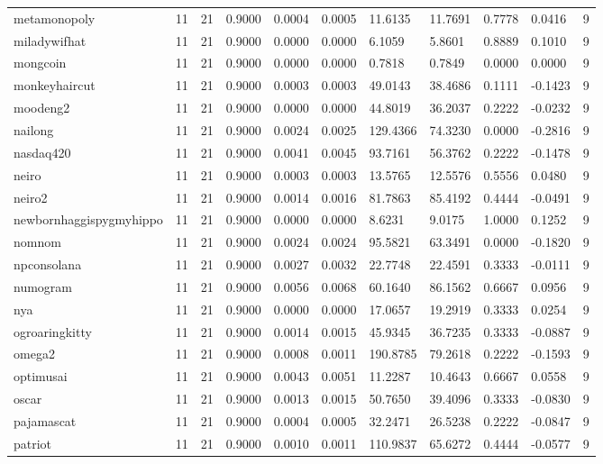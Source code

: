 \begin{table}[htbp]
\begin{tabular}{lllllllllll}
metamonopoly & 11 & 21 & 0.9000 & 0.0004 & 0.0005 & 11.6135 & 11.7691 & 0.7778 & 0.0416 & 9 \\
miladywifhat & 11 & 21 & 0.9000 & 0.0000 & 0.0000 & 6.1059 & 5.8601 & 0.8889 & 0.1010 & 9 \\
mongcoin & 11 & 21 & 0.9000 & 0.0000 & 0.0000 & 0.7818 & 0.7849 & 0.0000 & 0.0000 & 9 \\
monkeyhaircut & 11 & 21 & 0.9000 & 0.0003 & 0.0003 & 49.0143 & 38.4686 & 0.1111 & -0.1423 & 9 \\
moodeng2 & 11 & 21 & 0.9000 & 0.0000 & 0.0000 & 44.8019 & 36.2037 & 0.2222 & -0.0232 & 9 \\
nailong & 11 & 21 & 0.9000 & 0.0024 & 0.0025 & 129.4366 & 74.3230 & 0.0000 & -0.2816 & 9 \\
nasdaq420 & 11 & 21 & 0.9000 & 0.0041 & 0.0045 & 93.7161 & 56.3762 & 0.2222 & -0.1478 & 9 \\
neiro & 11 & 21 & 0.9000 & 0.0003 & 0.0003 & 13.5765 & 12.5576 & 0.5556 & 0.0480 & 9 \\
neiro2 & 11 & 21 & 0.9000 & 0.0014 & 0.0016 & 81.7863 & 85.4192 & 0.4444 & -0.0491 & 9 \\
newbornhaggispygmyhippo & 11 & 21 & 0.9000 & 0.0000 & 0.0000 & 8.6231 & 9.0175 & 1.0000 & 0.1252 & 9 \\
nomnom & 11 & 21 & 0.9000 & 0.0024 & 0.0024 & 95.5821 & 63.3491 & 0.0000 & -0.1820 & 9 \\
npconsolana & 11 & 21 & 0.9000 & 0.0027 & 0.0032 & 22.7748 & 22.4591 & 0.3333 & -0.0111 & 9 \\
numogram & 11 & 21 & 0.9000 & 0.0056 & 0.0068 & 60.1640 & 86.1562 & 0.6667 & 0.0956 & 9 \\
nya & 11 & 21 & 0.9000 & 0.0000 & 0.0000 & 17.0657 & 19.2919 & 0.3333 & 0.0254 & 9 \\
ogroaringkitty & 11 & 21 & 0.9000 & 0.0014 & 0.0015 & 45.9345 & 36.7235 & 0.3333 & -0.0887 & 9 \\
omega2 & 11 & 21 & 0.9000 & 0.0008 & 0.0011 & 190.8785 & 79.2618 & 0.2222 & -0.1593 & 9 \\
optimusai & 11 & 21 & 0.9000 & 0.0043 & 0.0051 & 11.2287 & 10.4643 & 0.6667 & 0.0558 & 9 \\
oscar & 11 & 21 & 0.9000 & 0.0013 & 0.0015 & 50.7650 & 39.4096 & 0.3333 & -0.0830 & 9 \\
pajamascat & 11 & 21 & 0.9000 & 0.0004 & 0.0005 & 32.2471 & 26.5238 & 0.2222 & -0.0847 & 9 \\
patriot & 11 & 21 & 0.9000 & 0.0010 & 0.0011 & 110.9837 & 65.6272 & 0.4444 & -0.0577 & 9 \\

\end{tabular}
\end{table}
